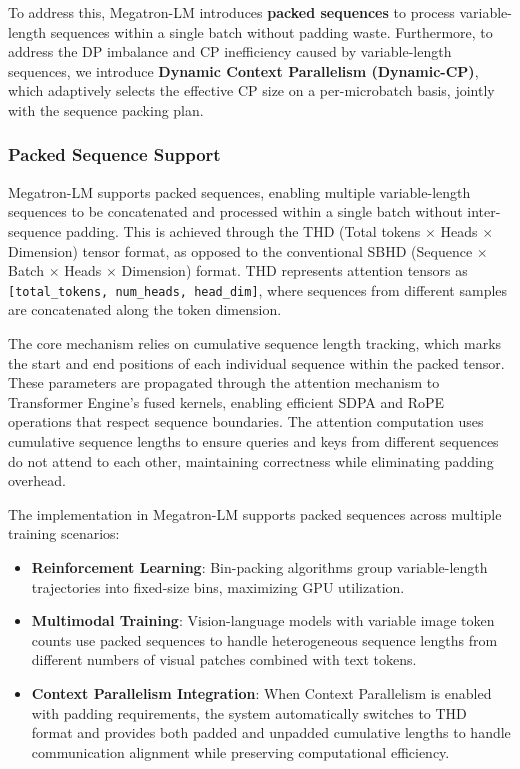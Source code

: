 To address this, Megatron-LM introduces \textbf{packed sequences} to process variable-length sequences within a single batch without padding waste. Furthermore, to address the DP imbalance and CP inefficiency caused by variable-length sequences, we introduce \textbf{Dynamic Context Parallelism (Dynamic-CP)}, which adaptively selects the effective CP size on a per-microbatch basis, jointly with the sequence packing plan.

\subsubsection{Packed Sequence Support}\label{subsec:packed_sequence_support}

Megatron-LM supports packed sequences, enabling multiple variable-length sequences to be concatenated and processed within a single batch without inter-sequence padding. This is achieved through the THD (Total tokens $\times$ Heads $\times$ Dimension) tensor format, as opposed to the conventional SBHD (Sequence $\times$ Batch $\times$ Heads $\times$ Dimension) format. THD represents attention tensors as \texttt{[total\_tokens, num\_heads, head\_dim]}, where sequences from different samples are concatenated along the token dimension.

The core mechanism relies on cumulative sequence length tracking, which marks the start and end positions of each individual sequence within the packed tensor. These parameters are propagated through the attention mechanism to Transformer Engine's fused kernels, enabling efficient SDPA and RoPE operations that respect sequence boundaries. The attention computation uses cumulative sequence lengths to ensure queries and keys from different sequences do not attend to each other, maintaining correctness while eliminating padding overhead.

The implementation in Megatron-LM supports packed sequences across multiple training scenarios:
\begin{itemize}
    \item \textbf{Reinforcement Learning}: Bin-packing algorithms group variable-length trajectories into fixed-size bins, maximizing GPU utilization.
    \item \textbf{Multimodal Training}: Vision-language models with variable image token counts use packed sequences to handle heterogeneous sequence lengths from different numbers of visual patches combined with text tokens.
    \item \textbf{Context Parallelism Integration}: When Context Parallelism is enabled with padding requirements, the system automatically switches to THD format and provides both padded and unpadded cumulative lengths to handle communication alignment while preserving computational efficiency.
\end{itemize}

